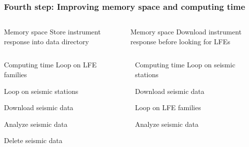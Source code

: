 \documentclass{beamer}
\begin{document}
	\begin{frame}
		\frametitle{Fourth step: Improving memory space and computing time}
		\begin{columns}[c]
			\begin{column}{5cm}
				\begin{block}{Memory space}
				Store instrument response into data directory
				\end{block}
			\end{column}
			\begin{column}{1cm}
				\centering
				\Huge\pointer
			\end{column}
			\begin{column}{5cm}
				\begin{block}{Memory space}
				Download instrument response before looking for LFEs
				\end{block}
			\end{column}
		\end{columns}

		\vspace{1cm}

		\begin{columns}[c]
			\begin{column}{5cm}
				\begin{block}{Computing time}
				Loop on LFE families

				\hspace{5mm} Loop on seismic stations

				\hspace{1cm} Download seismic data

				\hspace{5mm} Analyze seismic data

				\hspace{5mm} Delete seismic data
				\end{block}
			\end{column}
			\begin{column}{1cm}
				\centering
				\Huge\pointer
			\end{column}
			\begin{column}{5cm}
				\begin{block}{Computing time}
				Loop on seismic stations

				\hspace{5mm} Download seismic data

				Loop on LFE families

				\hspace{5mm} Analyze seismic data


\end{block}
\end{column}
\end{columns}
\end{frame}
\end{document}
